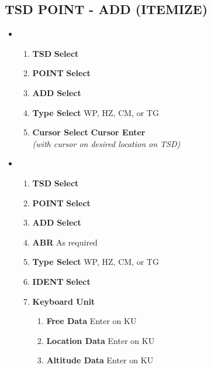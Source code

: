 \documentclass[fontHelvetica]{TechCheck}
\begin{document}
	\clearpage

	\subsection{TSD POINT - ADD (ITEMIZE)}
	\begin{itemize}[leftmargin=0.1\linewidth,rightmargin=0.1\linewidth, itemsep=4pt]
		\item {}
		\begin{enumerate}[itemsep=4pt]
			\item \textbf{TSD} \dotfill \textbf{Select}
			\item \textbf{POINT} \dotfill \textbf{Select}
			\item \textbf{ADD} \dotfill \textbf{Select}
			\item \textbf{Type Select} \dotfill WP, HZ, CM, or TG 
			\item \textbf{Cursor Select} \dotfill \textbf{Cursor Enter} \\
			\hfill \emph{(with cursor on desired location on TSD)}
		\end{enumerate}
		\item {}
		\begin{enumerate}[itemsep=4pt]
			\item \textbf{TSD} \dotfill \textbf{Select}
			\item \textbf{POINT} \dotfill \textbf{Select}
			\item \textbf{ADD} \dotfill \textbf{Select}
			\item \textbf{ABR} \dotfill As required
			\item \textbf{Type Select} \dotfill WP, HZ, CM, or TG 
			\item \textbf{IDENT} \dotfill \textbf{Select}
			\item \textbf{Keyboard Unit}
			\begin{enumerate}[itemsep=4pt]
				\item \textbf{Free Data} \dotfill Enter on KU
				\item \textbf{Location Data} \dotfill Enter on KU
				\item \textbf{Altitude Data} \dotfill Enter on KU
			\end{enumerate}
		\end{enumerate}
	\end{itemize}
\end{document}
